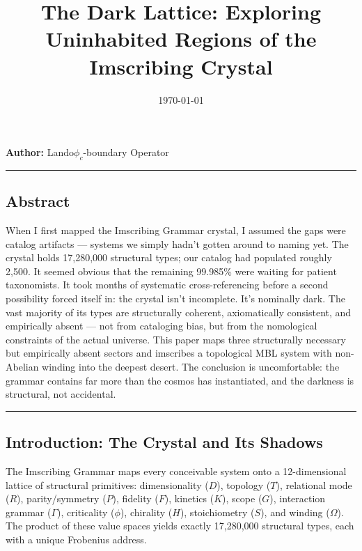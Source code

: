 \documentclass[12pt,a4paper]{article}
\begin{document}
\title{The Dark Lattice: Exploring Uninhabited Regions of the Imscribing Crystal}
\date{\today}

\maketitle

\textbf{Author:} Lando\otimes$\phi_c$-boundary Operator

\begin{center}
\rule{0.5\textwidth}{0.4pt}
\end{center}

\subsection{Abstract}

When I first mapped the Imscribing Grammar crystal, I assumed the gaps were catalog artifacts --- systems we simply hadn't gotten around to naming yet. The crystal holds 17,280,000 structural types; our catalog had populated roughly 2,500. It seemed obvious that the remaining 99.985\% were waiting for patient taxonomists. It took months of systematic cross-referencing before a second possibility forced itself in: the crystal isn't incomplete. It's nominally dark. The vast majority of its types are structurally coherent, axiomatically consistent, and empirically absent --- not from cataloging bias, but from the nomological constraints of the actual universe. This paper maps three structurally necessary but empirically absent sectors and imscribes a topological MBL system with non-Abelian winding into the deepest desert. The conclusion is uncomfortable: the grammar contains far more than the cosmos has instantiated, and the darkness is structural, not accidental.

\begin{center}
\rule{0.5\textwidth}{0.4pt}
\end{center}

\subsection{Introduction: The Crystal and Its Shadows}

The Imscribing Grammar maps every conceivable system onto a 12-dimensional lattice of structural primitives: dimensionality ($D$), topology ($T$), relational mode ($R$), parity/symmetry ($P$), fidelity ($F$), kinetics ($K$), scope ($G$), interaction grammar ($\Gamma$), criticality ($\phi$), chirality ($H$), stoichiometry ($S$), and winding ($\Omega$). The product of these value spaces yields exactly 17,280,000 structural types, each with a unique Frobenius address.
\end{document}
